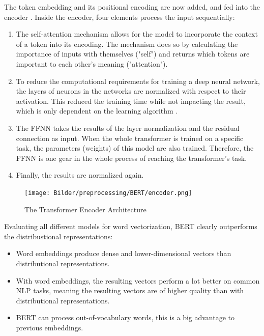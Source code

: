                
               The token embedding and its positional encoding are now added, and fed into the encoder \cite{illustratedTransformer}. Inside the encoder, four elements process the input sequentially:
               
               \begin{enumerate}
               	\item The self-attention mechanism allows for the model to incorporate the context of a token into its encoding. The mechanism does so by calculating the importance of inputs with themselves ("self") and returns which tokens are important to each other's meaning ("attention").
               	\item To reduce the computational requirements for training a deep neural network, the layers of neurons in the networks are normalized with respect to their activation. This reduced the training time while not impacting the result, which is only dependent on the learning algorithm \cite[p.~10]{baLayerNormalization2016}.
               	\item The \ac{FFNN} takes the results of the layer normalization and the residual connection as input. When the whole transformer is trained on a specific task, the parameters (weights) of this model are also trained. Therefore, the \ac{FFNN} is one gear in the whole process of reaching the transformer's task.
               	\item Finally, the results are normalized again.
               \end{enumerate}
       			
       			 \begin{figure}[h!]
       				\label{fig:encoder}
       				\centering
       				\texttt{[image: Bilder/preprocessing/BERT/encoder.png]}
       				\caption[The Transformer Encoder Architecture]{The Transformer Encoder Architecture  \cite{illustratedTransformer}}
       			\end{figure}
			
            
            Evaluating all different models for word vectorization, BERT clearly outperforms the distribustional representations:
            \begin{itemize}
            	\item Word embeddings produce dense and lower-dimensional vectors than distributional representations.
            	\item With word embeddings, the resulting vectors perform a lot better on common \ac{NLP} tasks, meaning the resulting vectors are of higher quality than with distributional representations.
            	\item BERT can process out-of-vocabulary words, this is a big advantage to previous embeddings.
            \end{itemize}

